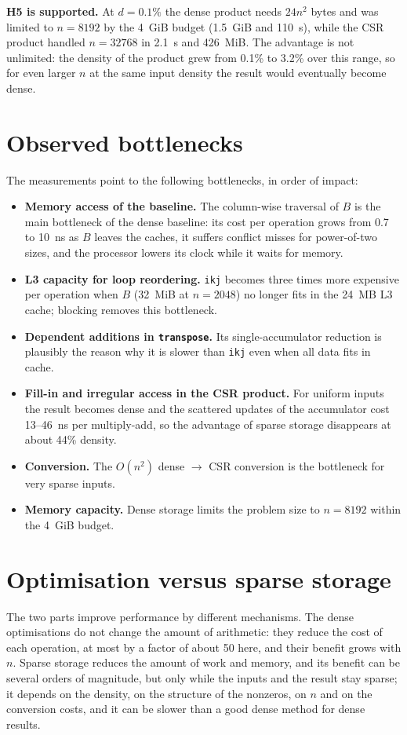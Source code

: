 \documentclass[12pt,a4paper]{report}
\begin{document}
\textbf{H5 is supported.} At $d = 0.1\%$ the dense product needs $24n^2$ bytes and was limited to $n = 8192$ by the
4~GiB budget (1.5~GiB and 110~s), while the CSR product handled $n = 32768$ in 2.1~s and 426~MiB. The advantage is not
unlimited: the density of the product grew from 0.1\% to 3.2\% over this range, so for even larger $n$ at the same
input density the result would eventually become dense.

\section{Observed bottlenecks}

The measurements point to the following bottlenecks, in order of impact:
\begin{itemize}
  \item \textbf{Memory access of the baseline.} The column-wise traversal of $B$ is the main bottleneck of the dense
  baseline: its cost per operation grows from 0.7 to 10~ns as $B$ leaves the caches, it suffers conflict misses for
  power-of-two sizes, and the processor lowers its clock while it waits for memory.
  \item \textbf{L3 capacity for loop reordering.} \texttt{ikj} becomes three times more expensive per operation when
  $B$ (32~MiB at $n = 2048$) no longer fits in the 24~MB L3 cache; blocking removes this bottleneck.
  \item \textbf{Dependent additions in \texttt{transpose}.} Its single-accumulator reduction is plausibly the reason
  why it is slower than \texttt{ikj} even when all data fits in cache.
  \item \textbf{Fill-in and irregular access in the CSR product.} For uniform inputs the result becomes dense and the
  scattered updates of the accumulator cost 13--46~ns per multiply-add, so the advantage of sparse storage disappears
  at about 44\% density.
  \item \textbf{Conversion.} The $O(n^2)$ dense $\to$ CSR conversion is the bottleneck for very sparse inputs.
  \item \textbf{Memory capacity.} Dense storage limits the problem size to $n = 8192$ within the 4~GiB budget.
\end{itemize}

\section{Optimisation versus sparse storage}

The two parts improve performance by different mechanisms. The dense optimisations do not change the amount of
arithmetic: they reduce the cost of each operation, at most by a factor of about 50 here, and their benefit grows with
$n$. Sparse storage reduces the amount of work and memory, and its benefit can be several orders of magnitude, but only
while the inputs and the result stay sparse; it depends on the density, on the structure of the nonzeros, on $n$ and
on the conversion costs, and it can be slower than a good dense method for dense results.
\end{document}
